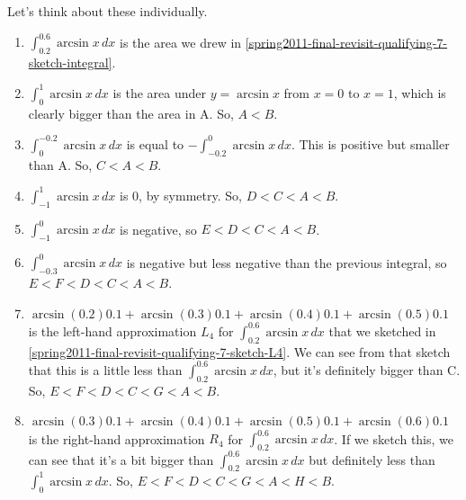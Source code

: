 \documentclass{article}
\begin{document}
\begin{enumerate}
\begin{enumerate}
    \begin{solution}
      Let's think about these individually.
      \begin{enumerate}[label=\Alph*.]
      \item $\displaystyle \int_{0.2}^{0.6} \arcsin x\,dx$ is the area we
        drew in \ref{spring2011-final-revisit-qualifying-7-sketch-integral}.
      \item $\displaystyle \int_{0}^{1} \arcsin x\,dx$ is the area under $y
        = \arcsin x$ from $x = 0$ to $x = 1$, which is clearly bigger than
        the area in A.  So, $A < B$.
      \item $\displaystyle \int_{0}^{-0.2} \arcsin x\,dx$ is equal to
        $-\displaystyle \int_{-0.2}^0 \arcsin x\,dx$.  This is positive but
        smaller than A. So, $C < A < B$.
      \item $\displaystyle \int_{-1}^1 \arcsin x\,dx$ is 0, by symmetry.
        So, $D < C < A < B$. 
      \item $\displaystyle \int_{-1}^0  \arcsin x\,dx$ is negative, so $E <
        D < C < A < B$.
      \item $\displaystyle \int_{-0.3}^0\arcsin x\,dx$ is negative but less
        negative than the previous integral, so $E < F < D < C < A < B$. 
      \item $\displaystyle \arcsin (0.2) 0.1 + \arcsin (0.3) 0.1
        +\arcsin (0.4) 0.1 +\arcsin (0.5) 0.1$ is the left-hand
        approximation $L_4$ for $\displaystyle \int_{0.2}^{0.6} \arcsin
        x\,dx$ that we sketched in
        \ref{spring2011-final-revisit-qualifying-7-sketch-L4}.  We can see
        from that sketch that this is a little less than $\displaystyle
        \int_{0.2}^{0.6} \arcsin x\,dx$, but it's definitely bigger than
        C.  So, $E < F < D < C <G < A < B$. 
      \item $\displaystyle \arcsin (0.3) 0.1 +\arcsin (0.4) 0.1 +\arcsin
        (0.5) 0.1+ \arcsin (0.6) 0.1$ is the right-hand approximation
        $R_4$ for $\displaystyle \int_{0.2}^{0.6} \arcsin x\,dx$.  If we
        sketch this, we can see that it's a bit bigger than $\displaystyle
        \int_{0.2}^{0.6} \arcsin x\,dx$ but definitely less than
        $\displaystyle \int_0^1 \arcsin x\,dx$. So, $\boxed{E < F < D < C <
          G < A < H < B}$. 
      \end{enumerate}      
    \end{solution}

  \end{enumerate}

\end{enumerate}
\end{document}
